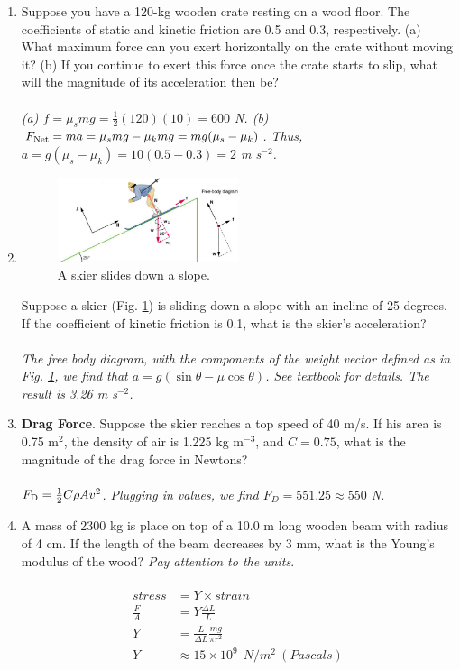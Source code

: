 \documentclass[10pt]{article}
\begin{document}
\begin{enumerate}
\item Suppose you have a 120-kg wooden crate resting on a wood floor. The coefficients of static and kinetic friction are 0.5 and 0.3, respectively.  (a) What maximum force can you exert horizontally on the crate without moving it? (b) If you continue to exert this force once the crate starts to slip, what will the magnitude of its acceleration then be? \\ \\
\textit{(a) $f = \mu_s m g = \frac{1}{2} (120) (10) = 600$ N.  (b) $F_{\rm Net} = ma = \mu_s m g - \mu_k m g = mg (\mu_s - \mu_k)$.  Thus, $a = g(\mu_s - \mu_k) = 10 (0.5 - 0.3) = 2$ m s$^{-2}$.}
\item 
\begin{figure}[ht]
\centering
\includegraphics[width=0.5\textwidth]{ski.png}
\caption{\label{fig:ski} A skier slides down a slope.}
\end{figure}
Suppose a skier (Fig. \ref{fig:ski}) is sliding down a slope with an incline of 25 degrees.  If the coefficient of kinetic friction is 0.1, what is the skier's acceleration? \\ \\
\textit{The free body diagram, with the components of the weight vector defined as in Fig. \ref{fig:ski}, we find that $a = g(\sin\theta - \mu\cos\theta)$.  See textbook for details.  The result is 3.26 m s$^{-2}$.}
\item \textbf{Drag Force}.  Suppose the skier reaches a top speed of 40 m/s.  If his area is 0.75 m$^2$, the density of air is 1.225 kg m$^{-3}$, and $C = 0.75$, what is the magnitude of the drag force in Newtons?  \\ \\
\textit{ $F_{\rm D} = \frac{1}{2}C \rho A v^2$.  Plugging in values, we find $F_D = 551.25 \approx 550$ N.}
\item A mass of 2300 kg is place on top of a 10.0 m long wooden beam with radius of 4 cm. If the length of the beam decreases by 3 mm, what is the Young's modulus of the wood? \textit{Pay attention to the units}.  \\ \\
\begin{align}
stress &= Y \times strain \\
\frac{F}{A} &= Y \frac{\Delta L}{L} \\
Y &= \frac{L}{\Delta L}\frac{mg}{\pi r^2} \\
Y &\approx 15 \times 10^9 ~~ N/m^2 ~ (Pascals)
\end{align}
\end{enumerate}
\end{document}
